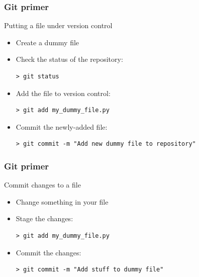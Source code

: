 \documentclass[mathserif, xcolor=dvipsnames]{beamer}
\begin{document}
\begin{frame}[fragile]
    \frametitle{Git primer}
    \begin{block}{Putting a file under version control}
    \begin{itemize}
        \item{Create a dummy file}
        \item{Check the status of the repository:
\begin{lstlisting}
> git status
\end{lstlisting}}
        \item{Add the file to version control:
\begin{lstlisting}
> git add my_dummy_file.py
\end{lstlisting}}
        \item{Commit the newly-added file:
\begin{lstlisting}
> git commit -m "Add new dummy file to repository"
\end{lstlisting}}
    \end{itemize}
    \end{block}
\end{frame}

\begin{frame}[fragile]
    \frametitle{Git primer}
    \begin{block}{Commit changes to a file}
    \begin{itemize}
        \item{Change something in your file}
        \item{Stage the changes:
\begin{lstlisting}
> git add my_dummy_file.py
\end{lstlisting}}
        \item{Commit the changes:
\begin{lstlisting}
> git commit -m "Add stuff to dummy file"
\end{lstlisting}}
    \end{itemize}
    \end{block}
\end{frame}
\end{document}
